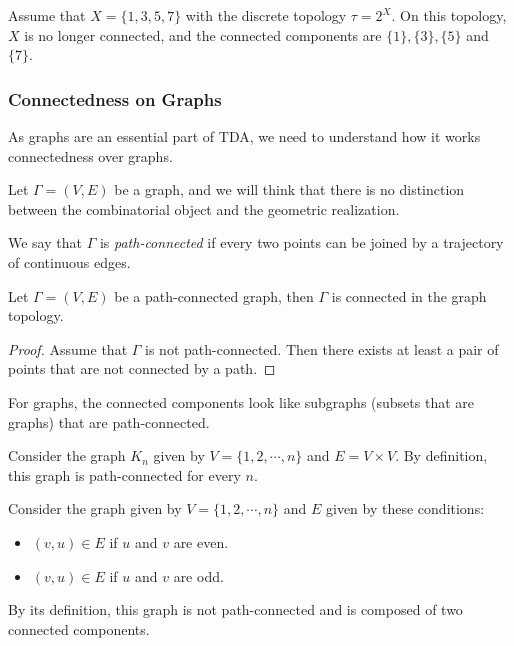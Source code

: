\documentclass[
	fontsize=10pt, %
	twoside=false, %
	secnumdepth=1, %
]{kaobook}
\begin{document}
\begin{example}
Assume that $X=\{1,3,5,7\}$ with the discrete topology $\tau=2^X.$ On this topology, $X$ is no longer connected, and the connected components are $\{1\},\{3\},\{5\}$ and $\{7\}.$
\end{example}

\subsubsection{Connectedness on Graphs}

As graphs are an essential part of TDA, we need to understand how it works connectedness over graphs. 

Let $\Gamma=(V, E)$ be a graph, and we will think that there is no distinction between the combinatorial object and the geometric realization. 

\begin{definition}
We say that $\Gamma$ is \emph{path-connected} if every two points can be joined by a trajectory of continuous edges. 
\end{definition}

\begin{proposition} 
Let $\Gamma=(V, E)$ be a path-connected graph, then $\Gamma$ is connected in the graph topology. 
\end{proposition}
\begin{proof}
Assume that $\Gamma$ is not path-connected. Then there exists at least a pair of points that are not connected by a path. 
\end{proof}

For graphs, the connected components look like subgraphs (subsets that are graphs) that are path-connected.

\begin{example}
Consider the graph $K_n$ given by $V=\{1,2,\cdots, n\}$ and $E=V\times V.$ By definition, this graph is path-connected for every $n.$ 
\end{example}

\begin{example}
Consider the graph given by $V=\{1,2,\cdots, n\}$ and $E$ given by these conditions:
\begin{itemize}
\item $(v,u)\in E$ if $u$ and $v$ are even.
\item $(v,u)\in E$ if $u$ and $v$ are odd.
\end{itemize}

By its definition, this graph is not path-connected and is composed of two connected components.
\end{example}
\end{document}
